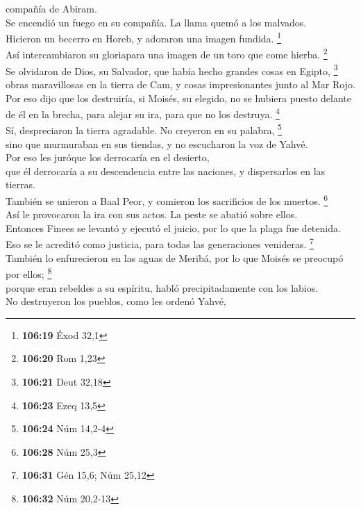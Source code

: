 compañía de Abiram.\\
 Se encendió un fuego en su compañía. La llama quemó a
los malvados.\\
 Hicieron un becerro en Horeb, y adoraron una imagen
fundida. \footnote{\textbf{106:19} Éxod 32,1}\\
 Así intercambiaron su gloriapara una imagen de un toro
que come hierba. \footnote{\textbf{106:20} Rom 1,23}\\
 Se olvidaron de Dios, su Salvador, que había hecho
grandes cosas en Egipto, \footnote{\textbf{106:21} Deut 32,18}\\
 obras maravillosas en la tierra de Cam, y cosas
impresionantes junto al Mar Rojo.\\
 Por eso dijo que los destruiría, si Moisés, su elegido,
no se hubiera puesto delante de él en la brecha, para alejar su ira,
para que no los destruya. \footnote{\textbf{106:23} Ezeq 13,5}\\
 Sí, despreciaron la tierra agradable. No creyeron en su
palabra, \footnote{\textbf{106:24} Núm 14,2-4}\\
 sino que murmuraban en sus tiendas, y no escucharon la
voz de Yahvé.\\
 Por eso les juróque los derrocaría en el desierto,\\
 que él derrocaría a su descendencia entre las naciones,
y dispersarlos en las tierras.\\
 También se unieron a Baal Peor, y comieron los
sacrificios de los muertos. \footnote{\textbf{106:28} Núm 25,3}\\
 Así le provocaron la ira con sus actos. La peste se
abatió sobre ellos.\\
 Entonces Finees se levantó y ejecutó el juicio, por lo
que la plaga fue detenida.\\
 Eso se le acreditó como justicia, para todas las
generaciones venideras. \footnote{\textbf{106:31} Gén 15,6; Núm 25,12}\\
 También lo enfurecieron en las aguas de Meribá, por lo
que Moisés se preocupó por ellos; \footnote{\textbf{106:32} Núm 20,2-13}\\
 porque eran rebeldes a su espíritu, habló
precipitadamente con los labios.\\
 No destruyeron los pueblos, como les ordenó Yahvé,
